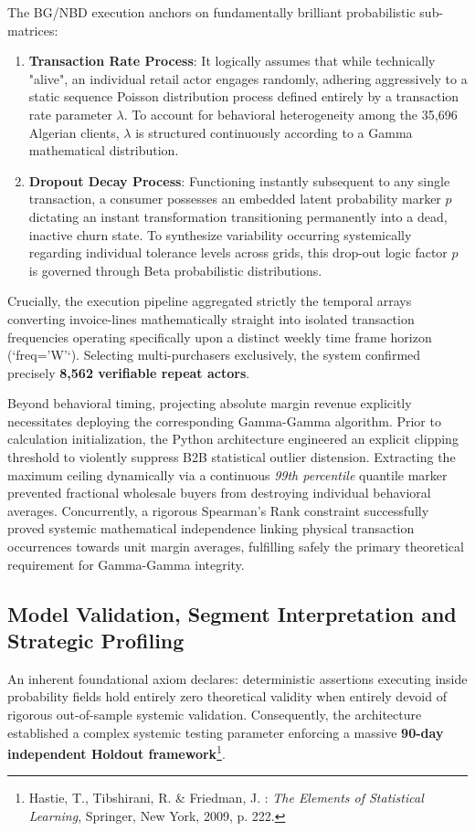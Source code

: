 \documentclass[12pt,a4paper]{report}
\begin{document}
The BG/NBD execution anchors on fundamentally brilliant probabilistic sub-matrices:
\begin{enumerate}
    \item \textbf{Transaction Rate Process}: It logically assumes that while technically "alive", an individual retail actor engages randomly, adhering aggressively to a static sequence Poisson distribution process defined entirely by a transaction rate parameter $\lambda$. To account for behavioral heterogeneity among the 35,696 Algerian clients, $\lambda$ is structured continuously according to a Gamma mathematical distribution.
    \item \textbf{Dropout Decay Process}: Functioning instantly subsequent to any single transaction, a consumer possesses an embedded latent probability marker $p$ dictating an instant transformation transitioning permanently into a dead, inactive churn state. To synthesize variability occurring systemically regarding individual tolerance levels across grids, this drop-out logic factor $p$ is governed through Beta probabilistic distributions.
\end{enumerate}

Crucially, the execution pipeline aggregated strictly the temporal arrays converting invoice-lines mathematically straight into isolated transaction frequencies operating specifically upon a distinct weekly time frame horizon (`freq='W'`). Selecting multi-purchasers exclusively, the system confirmed precisely \textbf{8,562 verifiable repeat actors}.

Beyond behavioral timing, projecting absolute margin revenue explicitly necessitates deploying the corresponding Gamma-Gamma algorithm. Prior to calculation initialization, the Python architecture engineered an explicit clipping threshold to violently suppress B2B statistical outlier distension. Extracting the maximum ceiling dynamically via a continuous \textit{99th percentile} quantile marker prevented fractional wholesale buyers from destroying individual behavioral averages. Concurrently, a rigorous Spearman’s Rank constraint successfully proved systemic mathematical independence linking physical transaction occurrences towards unit margin averages, fulfilling safely the primary theoretical requirement for Gamma-Gamma integrity.

\subsection{Model Validation, Segment Interpretation and Strategic Profiling}
An inherent foundational axiom declares: deterministic assertions executing inside probability fields hold entirely zero theoretical validity when entirely devoid of rigorous out-of-sample systemic validation. Consequently, the architecture established a complex systemic testing parameter enforcing a massive \textbf{90-day independent Holdout framework}\footnote{Hastie, T., Tibshirani, R. \& Friedman, J. : \textit{The Elements of Statistical Learning}, Springer, New York, 2009, p. 222.}. 
\end{document}
